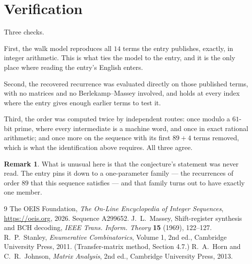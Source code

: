 \documentclass[11pt,a4paper]{article}
\theoremstyle{plain}
\theoremstyle{definition}
\newtheorem{remark}[theorem]{Remark}
\begin{document}
\section{Verification}

Three checks.

First, the walk model reproduces all $14$ terms the entry publishes, exactly, in integer
arithmetic. This is what ties the model to the entry, and it is the only place where reading
the entry's English enters.

Second, the recovered recurrence was evaluated directly on those published terms, with no
matrices and no Berlekamp--Massey involved, and holds at every index where the entry gives
enough earlier terms to test it.

Third, the order was computed twice by independent routes: once modulo a $61$-bit prime, where
every intermediate is a machine word, and once in exact rational arithmetic; and once more on
the sequence with its first $89+4$ terms removed, which is what the identification above
requires. All three agree.

\begin{remark}
What is unusual here is that the conjecture's statement was never read. The entry pins it down
to a one-parameter family --- the recurrences of order $89$ that this sequence satisfies
--- and that family turns out to have exactly one member.
\end{remark}

\begin{thebibliography}{9}
 The OEIS Foundation, \emph{The On-Line Encyclopedia of Integer
Sequences}, \url{https://oeis.org}, 2026. Sequence A299652.
 J.~L.~Massey, Shift-register synthesis and BCH decoding, \emph{IEEE
Trans. Inform. Theory} \textbf{15} (1969), 122--127.
 R.~P.~Stanley, \emph{Enumerative Combinatorics}, Volume 1, 2nd ed.,
Cambridge University Press, 2011. (Transfer-matrix method, Section 4.7.)
 R.~A.~Horn and C.~R.~Johnson, \emph{Matrix Analysis}, 2nd ed., Cambridge
University Press, 2013.
\end{thebibliography}
\end{document}
